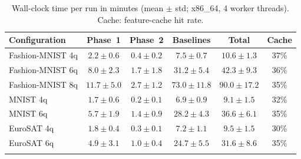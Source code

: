 \begin{table}[t]
\caption{Wall-clock time per run in minutes (mean $\pm$ std; x86\_64, 4 worker threads). Cache: feature-cache hit rate.}\label{tab:runtime}
\footnotesize
\begin{tabular}{@{}lccccc@{}}
\toprule
Configuration & Phase~1 & Phase~2 & Baselines & Total & Cache \\
\midrule
Fashion-MNIST 4q & $2.2\pm0.6$ & $0.4\pm0.2$ & $7.5\pm0.7$ & $10.6\pm1.3$ & 37\% \\
Fashion-MNIST 6q & $8.0\pm2.3$ & $1.7\pm1.8$ & $31.2\pm5.4$ & $42.3\pm9.3$ & 36\% \\
Fashion-MNIST 8q & $11.7\pm5.0$ & $2.7\pm1.2$ & $73.0\pm11.8$ & $90.0\pm17.2$ & 35\% \\
MNIST 4q & $1.7\pm0.6$ & $0.2\pm0.1$ & $6.9\pm0.9$ & $9.1\pm1.5$ & 32\% \\
MNIST 6q & $5.7\pm1.9$ & $1.4\pm0.9$ & $28.2\pm4.3$ & $36.6\pm6.1$ & 35\% \\
EuroSAT 4q & $1.8\pm0.4$ & $0.3\pm0.1$ & $7.2\pm1.1$ & $9.5\pm1.5$ & 30\% \\
EuroSAT 6q & $4.9\pm3.1$ & $1.0\pm0.4$ & $24.7\pm5.5$ & $31.6\pm8.6$ & 35\% \\
\botrule
\end{tabular}
\end{table}
